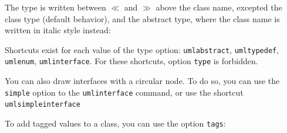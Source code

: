\documentclass[a4paper,11pt]{report}
\begin{document}
\medskip

\begin{remark}
	The type is written between $\ll$ and $\gg$ above the class name, excepted the class type (default behavior), and the abstract type, where the class name is written in italic style instead:
\end{remark}

\medskip

\begin{minipage}{0.5\textwidth}
	
\end{minipage}
\begin{minipage}{0.4\textwidth}
	\begin{center}
	\end{center}
\end{minipage}

\begin{remark}
	Shortcuts exist for each value of the type option: {\tt umlabstract}, {\tt umltypedef}, {\tt umlenum}, {\tt umlinterface}. For these shortcuts, option {\tt type} is forbidden.
\end{remark}

\begin{remark}
	You can also draw interfaces with a circular node. To do so, you can use the {\tt simple} option to the {\tt umlinterface} command, or use the shortcut {\tt umlsimpleinterface}
\end{remark}

\medskip

\begin{minipage}{0.5\textwidth}
	
\end{minipage}
\begin{minipage}{0.4\textwidth}
	\begin{center}
	\end{center}
\end{minipage}

To add tagged values to a class, you can use the option {\tt tags}:

\medskip

\begin{minipage}{0.5\textwidth}
	
\end{minipage}
\begin{minipage}{0.4\textwidth}
	\begin{center}
	\end{center}
\end{minipage}
\end{document}
